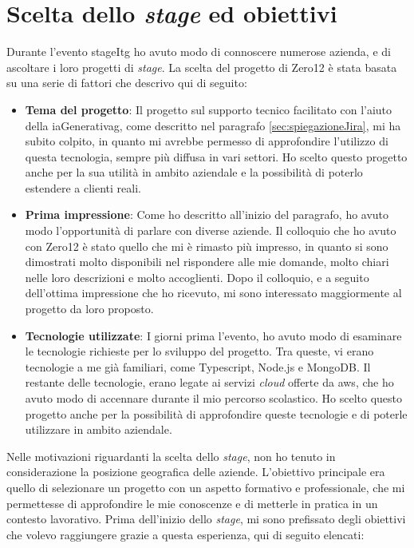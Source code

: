 \section{Scelta dello \textit{stage} ed obiettivi} \label{sec:sceltaStage}
Durante l'evento \gls{stageItg} ho avuto modo di connoscere numerose azienda, e di ascoltare i loro progetti di \textit{stage}. 
La scelta del progetto di Zero12 è stata basata su una serie di fattori che descrivo qui di seguito:
\begin{itemize}
    \item \textbf{Tema del progetto}: Il progetto sul supporto tecnico facilitato con l'aiuto della \gls{iaGenerativag}, come descritto nel paragrafo \ref{sec:spiegazioneJira}, mi ha subito colpito, in quanto mi avrebbe permesso di approfondire l'utilizzo di questa tecnologia, sempre più diffusa in vari settori. Ho scelto questo progetto anche per la sua utilità in ambito aziendale e la possibilità di poterlo estendere a clienti reali.
    \item \textbf{Prima impressione}: Come ho descritto all'inizio del paragrafo, ho avuto modo l'opportunità di parlare con diverse aziende. Il colloquio che ho avuto con Zero12 è stato quello che mi è rimasto più impresso, in quanto si sono dimostrati molto disponibili nel rispondere alle mie domande, molto chiari nelle loro descrizioni e molto accoglienti. Dopo il colloquio, e a seguito dell'ottima impressione che ho ricevuto, mi sono interessato maggiormente al progetto da loro proposto.
    \item \textbf{Tecnologie utilizzate}: I giorni prima l'evento, ho avuto modo di esaminare le tecnologie richieste per lo sviluppo del progetto. Tra queste, vi erano tecnologie a me già familiari, come Typescript, Node.js e MongoDB. Il restante delle tecnologie, erano legate ai servizi \textit{cloud} offerte da \gls{aws}, che ho avuto modo di accennare durante il mio percorso scolastico. Ho scelto questo progetto anche per la possibilità di approfondire queste tecnologie e di poterle utilizzare in ambito aziendale.
\end{itemize}
Nelle motivazioni riguardanti la scelta dello \textit{stage}, non ho tenuto in considerazione la posizione geografica delle aziende. L'obiettivo principale era quello di selezionare un progetto con un aspetto formativo e professionale, che mi permettesse di approfondire le mie conoscenze e di metterle in pratica in un contesto lavorativo.
Prima dell'inizio dello \textit{stage}, mi sono prefissato degli obiettivi che volevo raggiungere grazie a questa esperienza, qui di seguito elencati:
